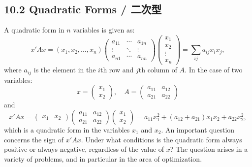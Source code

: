 \subsection{10.2 Quadratic Forms / 二次型}

\begin{original}
A quadratic form in $n$ variables is given as:
\[
x'Ax = (x_1, x_2, \ldots, x_n)
\begin{pmatrix}
a_{11} & \cdots & a_{1n} \\
\vdots & \ddots & \vdots \\
a_{n1} & \cdots & a_{nn}
\end{pmatrix}
\begin{pmatrix}
x_1 \\ x_2 \\ \vdots \\ x_n
\end{pmatrix}
= \sum_{ij} a_{ij} x_i x_j,
\]
where $a_{ij}$ is the element in the $i$th row and $j$th column of $A$.
In the case of two variables:
\[
x = \begin{pmatrix} x_1 \\ x_2 \end{pmatrix}, \quad
A = \begin{pmatrix} a_{11} & a_{12} \\ a_{21} & a_{22} \end{pmatrix}
\]
and
\[
x'Ax = \begin{pmatrix} x_1 & x_2 \end{pmatrix}
\begin{pmatrix} a_{11} & a_{12} \\ a_{21} & a_{22} \end{pmatrix}
\begin{pmatrix} x_1 \\ x_2 \end{pmatrix}
= a_{11}x_1^2 + (a_{12}+a_{21})x_1x_2 + a_{22}x_2^2,
\]
which is a quadratic form in the variables $x_1$ and $x_2$.
An important question concerns the sign of $x'Ax$. Under what conditions is the quadratic form always positive or always negative, regardless of the value of $x$? The question arises in a variety of problems, and in particular in the area of optimization.
\end{original}
